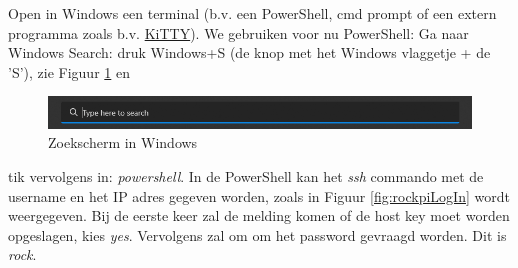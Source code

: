 Open in Windows een terminal (b.v. een PowerShell, cmd prompt of een extern programma zoals b.v. \href{https://www.fosshub.com/KiTTY.html}{KiTTY}). We gebruiken voor nu PowerShell: Ga naar Windows Search: druk Windows+S (de knop met het Windows vlaggetje + de 'S'), zie Figuur \ref{fig:windowsZk} en
\begin{figure}[h!]
	\centering
	\begin{center} 	
			\includegraphics[width=1\textwidth]{figuren/windowsPowerShellSearch}
			\caption{Zoekscherm in Windows}
			\label{fig:windowsZk}

	\end{center}
\end{figure}
tik vervolgens in: \textit{powershell}. In de PowerShell kan het \textit{ssh} commando met de username en het IP adres gegeven worden, zoals in Figuur \ref{fig:rockpiLogIn} wordt weergegeven. Bij de eerste keer zal de melding komen of de host key moet worden opgeslagen, kies \textit{yes}. Vervolgens zal om om het password gevraagd worden. Dit is \textit{rock}. 

